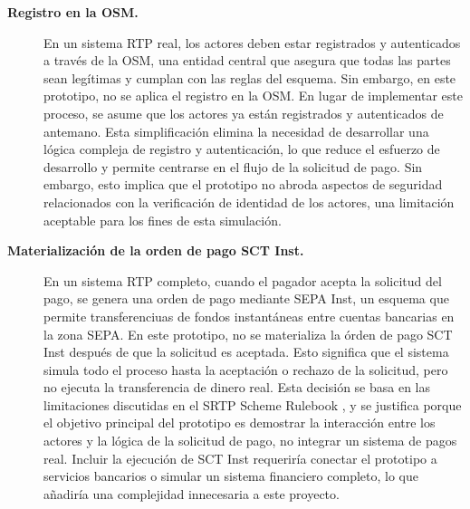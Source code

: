 \begin{description}
  \item[\textbf{Registro en la OSM.}]
  En un sistema RTP real, los actores deben estar registrados y autenticados a través de la OSM, una entidad central que asegura que todas las partes sean legítimas y cumplan con las reglas del esquema. Sin embargo, en este prototipo, no se aplica el registro en la OSM. En lugar de implementar este proceso, se asume que los actores ya están registrados y autenticados de antemano. Esta simplificación elimina la necesidad de desarrollar una lógica compleja de registro y autenticación, lo que reduce el esfuerzo de desarrollo y permite centrarse en el flujo de la solicitud de pago. Sin embargo, esto implica que el prototipo no abroda aspectos de seguridad relacionados con la verificación de identidad de los actores, una limitación aceptable para los fines de esta simulación.
  \item[\textbf{Materialización de la orden de pago SCT Inst.}]
  En un sistema RTP completo, cuando el pagador acepta la solicitud del pago, se genera una orden de pago mediante SEPA Inst, un esquema que permite transferenciuas de fondos instantáneas entre cuentas bancarias en la zona SEPA. En este prototipo, no se materializa la órden de pago SCT Inst después de que la solicitud es aceptada. Esto significa que el sistema simula todo el proceso hasta la aceptación o rechazo de la solicitud, pero no ejecuta la transferencia de dinero real. Esta decisión se basa en las limitaciones discutidas en el SRTP Scheme Rulebook \cite{epc014}, y se justifica porque el objetivo principal del prototipo es demostrar la interacción entre los actores y la lógica de la solicitud de pago, no integrar un sistema de pagos real. Incluir la ejecución de SCT Inst requeriría conectar el prototipo a servicios bancarios o simular un sistema financiero completo, lo que añadiría una complejidad innecesaria a este proyecto.
\end{description}

